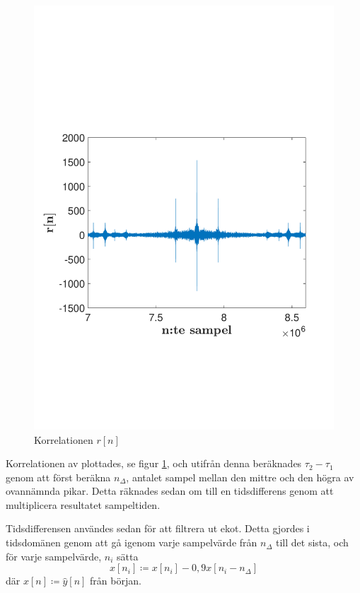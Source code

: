 \documentclass[10pt,twocolumn]{article}
\begin{document}
\begin{figure}
    \includegraphics[trim = 0 50mm 0 80mm, clip, width=\linewidth]{fig1.pdf}
    \caption{
        Korrelationen $r[n]$ 
        \label{fig:z}
    }
\end{figure}

Korrelationen av \yhat  plottades, se figur \ref{fig:z}, och utifrån denna beräknades $\tau_2 - \tau_1$ genom att först beräkna $n_\Delta$, antalet sampel mellan
den mittre och den högra av ovannämnda pikar. Detta räknades sedan om till en tidsdifferens genom att multiplicera resultatet
sampeltiden.

Tidsdifferensen användes sedan för att filtrera ut ekot. Detta gjordes i tidsdomänen genom att gå igenom varje sampelvärde
från $n_\Delta$ till det sista, och för varje sampelvärde, $n_i$ sätta 
\begin{equation}
x[n_i] \coloneqq x[n_i] - 0,9x[n_i - n_\Delta] 
\label{e4}
\end{equation}
där $x[n] \coloneqq \hat{y}[n]$ från början.
\end{document}
